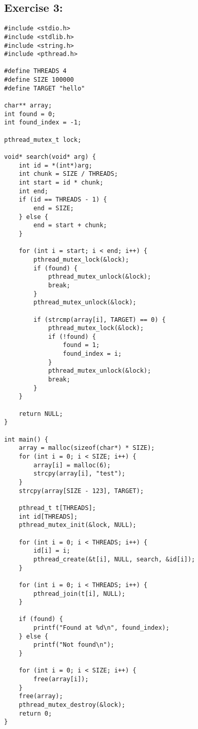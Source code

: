 \documentclass{article}
\begin{document}
\subsection*{Exercise 3:}
\begin{verbatim}
#include <stdio.h>
#include <stdlib.h>
#include <string.h>
#include <pthread.h>

#define THREADS 4
#define SIZE 100000
#define TARGET "hello"

char** array;
int found = 0;
int found_index = -1;

pthread_mutex_t lock;

void* search(void* arg) {
    int id = *(int*)arg;
    int chunk = SIZE / THREADS;
    int start = id * chunk;
    int end;
    if (id == THREADS - 1) {
        end = SIZE;
    } else {
        end = start + chunk;
    }

    for (int i = start; i < end; i++) {
        pthread_mutex_lock(&lock);
        if (found) {
            pthread_mutex_unlock(&lock);
            break;
        }
        pthread_mutex_unlock(&lock);

        if (strcmp(array[i], TARGET) == 0) {
            pthread_mutex_lock(&lock);
            if (!found) {
                found = 1;
                found_index = i;
            }
            pthread_mutex_unlock(&lock);
            break;
        }
    }

    return NULL;
}

int main() {
    array = malloc(sizeof(char*) * SIZE);
    for (int i = 0; i < SIZE; i++) {
        array[i] = malloc(6);
        strcpy(array[i], "test");
    }
    strcpy(array[SIZE - 123], TARGET);

    pthread_t t[THREADS];
    int id[THREADS];
    pthread_mutex_init(&lock, NULL);

    for (int i = 0; i < THREADS; i++) {
        id[i] = i;
        pthread_create(&t[i], NULL, search, &id[i]);
    }

    for (int i = 0; i < THREADS; i++) {
        pthread_join(t[i], NULL);
    }

    if (found) {
        printf("Found at %d\n", found_index);
    } else {
        printf("Not found\n");
    }

    for (int i = 0; i < SIZE; i++) {
        free(array[i]);
    }
    free(array);
    pthread_mutex_destroy(&lock);
    return 0;
}
\end{verbatim}
\end{document}
